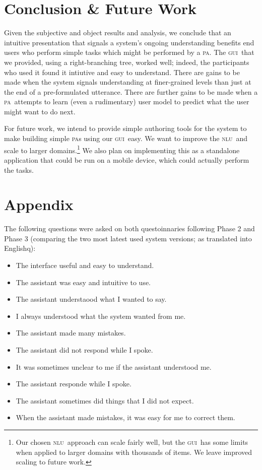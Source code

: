 \documentclass[11pt]{article}
\newcommand{\nlu}[0]{\textsc{nlu}}
\newcommand{\ui}[0]{\textsc{gui}}
\newcommand{\pa}[0]{\textsc{pa}}
\begin{document}
\section{Conclusion \& Future Work}

Given the subjective and object results and analysis, we conclude that an intuitive presentation that signals a system's ongoing understanding benefits end users who perform simple tasks which might be performed by a \pa. The \ui\ that we provided, using a right-branching tree, worked well; indeed, the participants who used it found it intiutive and easy to understand. There are gains to be made when the system signals understanding at finer-grained levels than just at the end of a pre-formulated utterance. There are further gains to be made when a \pa\ attempts to learn (even a rudimentary) user model to predict what the user might want to do next. 

For future work, we intend to provide simple authoring tools for the system to make building simple \pa s using our \ui\ easy. We want to improve the \nlu\ and scale to larger domains.\footnote{Our chosen \nlu\ approach can scale fairly well, but the \ui\ has some limits when applied to larger domains with thousands of items. We leave improved scaling to future work.} We also plan on implementing this as a standalone application that could be run on a mobile device, which could actually perform the tasks.


\section*{Appendix}

\noindent
The following questions were asked on both questoinnaries following Phase 2 and Phase 3 (comparing the two most latest used system versions; as translated into Englishq):
\begin{itemize}
 \item The interface useful and easy to understand.
 \item The assistant was easy and intuitive to use.
 \item The assistant understaood what I wanted to say.
 \item I always understood what the system wanted from me. 
 \item The assistant made many mistakes. 
 \item The assistant did not respond while I spoke.
 \item It was sometimes unclear to me if the assistant understood me. 
 \item The assistant responde while I spoke. 
 \item The assistant sometimes did things that I did not expect.
 \item When the assistant made mistakes, it was easy for me to correct them. 
\end{itemize}
\end{document}
